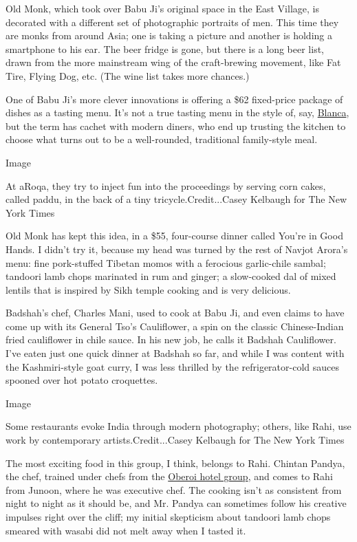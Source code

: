 Old Monk, which took over Babu Ji's original space in the East Village,
is decorated with a different set of photographic portraits of men. This
time they are monks from around Asia; one is taking a picture and
another is holding a smartphone to his ear. The beer fridge is gone, but
there is a long beer list, drawn from the more mainstream wing of the
craft-brewing movement, like Fat Tire, Flying Dog, etc. (The wine list
takes more chances.)

One of Babu Ji's more clever innovations is offering a \$62 fixed-price
package of dishes as a tasting menu. It's not a true tasting menu in the
style of, say,
\href{https://www.nytimes3xbfgragh.onion/2015/06/17/dining/restaurant-review-blanca-in-bushwick-brooklyn.html}{Blanca},
but the term has cachet with modern diners, who end up trusting the
kitchen to choose what turns out to be a well-rounded, traditional
family-style meal.

Image

At aRoqa, they try to inject fun into the proceedings by serving corn
cakes, called paddu, in the back of a tiny tricycle.Credit...Casey
Kelbaugh for The New York Times

Old Monk has kept this idea, in a \$55, four-course dinner called You're
in Good Hands. I didn't try it, because my head was turned by the rest
of Navjot Arora's menu: fine pork-stuffed Tibetan momos with a ferocious
garlic-chile sambal; tandoori lamb chops marinated in rum and ginger; a
slow-cooked dal of mixed lentils that is inspired by Sikh temple cooking
and is very delicious.

Badshah's chef, Charles Mani, used to cook at Babu Ji, and even claims
to have come up with its General Tso's Cauliflower, a spin on the
classic Chinese-Indian fried cauliflower in chile sauce. In his new job,
he calls it Badshah Cauliflower. I've eaten just one quick dinner at
Badshah so far, and while I was content with the Kashmiri-style goat
curry, I was less thrilled by the refrigerator-cold sauces spooned over
hot potato croquettes.

Image

Some restaurants evoke India through modern photography; others, like
Rahi, use work by contemporary artists.Credit...Casey Kelbaugh for The
New York Times

The most exciting food in this group, I think, belongs to Rahi. Chintan
Pandya, the chef, trained under chefs from the
\href{https://www.oberoihotels.com/}{Oberoi hotel group}, and comes to
Rahi from Junoon, where he was executive chef. The cooking isn't as
consistent from night to night as it should be, and Mr. Pandya can
sometimes follow his creative impulses right over the cliff; my initial
skepticism about tandoori lamb chops smeared with wasabi did not melt
away when I tasted it.

